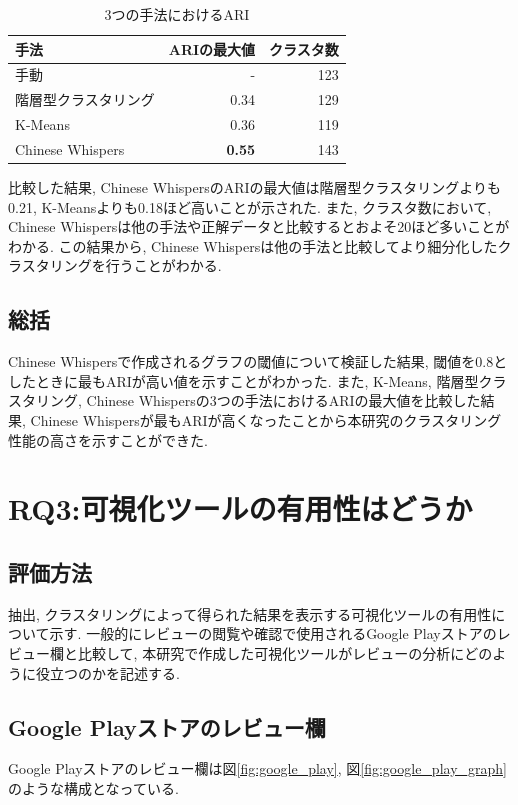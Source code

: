 \begin{table}[H]
  \caption{3つの手法におけるARI}
  \label{tb:two_ari}
  \begin{center}
  \begin{tabularx}{\linewidth}{X|r|r}
    \hline
    手法&ARIの最大値&クラスタ数\\\hline\hline
    手動&-&123\\\hline
    階層型クラスタリング&0.34&129\\\hline
    K-Means&0.36&119\\\hline
    Chinese Whispers&\textbf{0.55}&143\\\hline
  \end{tabularx}\end{center}
\end{table}

比較した結果, Chinese WhispersのARIの最大値は階層型クラスタリングよりも0.21, K-Meansよりも0.18ほど高いことが示された. また, クラスタ数において, Chinese Whispersは他の手法や正解データと比較するとおよそ20ほど多いことがわかる. 
この結果から, Chinese Whispersは他の手法と比較してより細分化したクラスタリングを行うことがわかる. 

\subsection{総括}
Chinese Whispersで作成されるグラフの閾値について検証した結果, 閾値を0.8としたときに最もARIが高い値を示すことがわかった. 
また, K-Means, 階層型クラスタリング, Chinese Whispersの3つの手法におけるARIの最大値を比較した結果, Chinese Whispersが最もARIが高くなったことから本研究のクラスタリング性能の高さを示すことができた. 


\section{RQ3:可視化ツールの有用性はどうか}
\subsection{評価方法}
抽出, クラスタリングによって得られた結果を表示する可視化ツールの有用性について示す. 一般的にレビューの閲覧や確認で使用されるGoogle Playストアのレビュー欄と比較して, 本研究で作成した可視化ツールがレビューの分析にどのように役立つのかを記述する. 

\subsection{Google Playストアのレビュー欄}
Google Playストアのレビュー欄は図\ref{fig:google_play}, 図\ref{fig:google_play_graph}のような構成となっている. 

